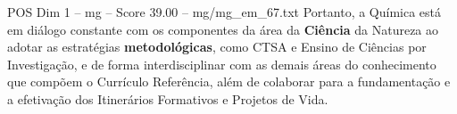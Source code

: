 \begin{textsample}{POS Dim 1 – mg – Score 39.00 – mg/mg\_em\_67.txt}
Portanto, a Química está em diálogo constante com os componentes da área da \textbf{Ciência} da Natureza ao adotar as estratégias \textbf{metodológicas}, como CTSA e Ensino de Ciências por Investigação, e de forma interdisciplinar com as demais áreas do conhecimento que compõem o Currículo Referência, além de colaborar para a fundamentação e a efetivação dos Itinerários Formativos e Projetos de Vida.

\end{textsample}
